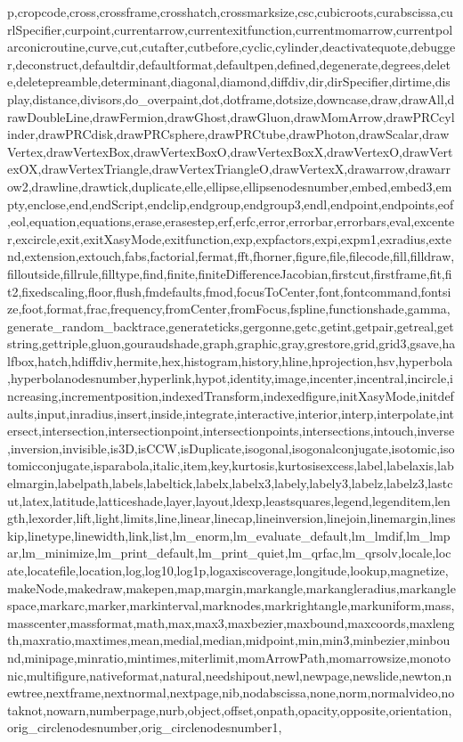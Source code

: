 {p,cropcode,cross,crossframe,crosshatch,crossmarksize,csc,cubicroots,curabscissa,curlSpecifier,curpoint,currentarrow,currentexitfunction,currentmomarrow,currentpolarconicroutine,curve,cut,cutafter,cutbefore,cyclic,cylinder,deactivatequote,debugger,deconstruct,defaultdir,defaultformat,defaultpen,defined,degenerate,degrees,delete,deletepreamble,determinant,diagonal,diamond,diffdiv,dir,dirSpecifier,dirtime,display,distance,divisors,do_overpaint,dot,dotframe,dotsize,downcase,draw,drawAll,drawDoubleLine,drawFermion,drawGhost,drawGluon,drawMomArrow,drawPRCcylinder,drawPRCdisk,drawPRCsphere,drawPRCtube,drawPhoton,drawScalar,drawVertex,drawVertexBox,drawVertexBoxO,drawVertexBoxX,drawVertexO,drawVertexOX,drawVertexTriangle,drawVertexTriangleO,drawVertexX,drawarrow,drawarrow2,drawline,drawtick,duplicate,elle,ellipse,ellipsenodesnumber,embed,embed3,empty,enclose,end,endScript,endclip,endgroup,endgroup3,endl,endpoint,endpoints,eof,eol,equation,equations,erase,erasestep,erf,erfc,error,errorbar,errorbars,eval,excenter,excircle,exit,exitXasyMode,exitfunction,exp,expfactors,expi,expm1,exradius,extend,extension,extouch,fabs,factorial,fermat,fft,fhorner,figure,file,filecode,fill,filldraw,filloutside,fillrule,filltype,find,finite,finiteDifferenceJacobian,firstcut,firstframe,fit,fit2,fixedscaling,floor,flush,fmdefaults,fmod,focusToCenter,font,fontcommand,fontsize,foot,format,frac,frequency,fromCenter,fromFocus,fspline,functionshade,gamma,generate_random_backtrace,generateticks,gergonne,getc,getint,getpair,getreal,getstring,gettriple,gluon,gouraudshade,graph,graphic,gray,grestore,grid,grid3,gsave,halfbox,hatch,hdiffdiv,hermite,hex,histogram,history,hline,hprojection,hsv,hyperbola,hyperbolanodesnumber,hyperlink,hypot,identity,image,incenter,incentral,incircle,increasing,incrementposition,indexedTransform,indexedfigure,initXasyMode,initdefaults,input,inradius,insert,inside,integrate,interactive,interior,interp,interpolate,intersect,intersection,intersectionpoint,intersectionpoints,intersections,intouch,inverse,inversion,invisible,is3D,isCCW,isDuplicate,isogonal,isogonalconjugate,isotomic,isotomicconjugate,isparabola,italic,item,key,kurtosis,kurtosisexcess,label,labelaxis,labelmargin,labelpath,labels,labeltick,labelx,labelx3,labely,labely3,labelz,labelz3,lastcut,latex,latitude,latticeshade,layer,layout,ldexp,leastsquares,legend,legenditem,length,lexorder,lift,light,limits,line,linear,linecap,lineinversion,linejoin,linemargin,lineskip,linetype,linewidth,link,list,lm_enorm,lm_evaluate_default,lm_lmdif,lm_lmpar,lm_minimize,lm_print_default,lm_print_quiet,lm_qrfac,lm_qrsolv,locale,locate,locatefile,location,log,log10,log1p,logaxiscoverage,longitude,lookup,magnetize,makeNode,makedraw,makepen,map,margin,markangle,markangleradius,markanglespace,markarc,marker,markinterval,marknodes,markrightangle,markuniform,mass,masscenter,massformat,math,max,max3,maxbezier,maxbound,maxcoords,maxlength,maxratio,maxtimes,mean,medial,median,midpoint,min,min3,minbezier,minbound,minipage,minratio,mintimes,miterlimit,momArrowPath,momarrowsize,monotonic,multifigure,nativeformat,natural,needshipout,newl,newpage,newslide,newton,newtree,nextframe,nextnormal,nextpage,nib,nodabscissa,none,norm,normalvideo,notaknot,nowarn,numberpage,nurb,object,offset,onpath,opacity,opposite,orientation,orig_circlenodesnumber,orig_circlenodesnumber1,}

